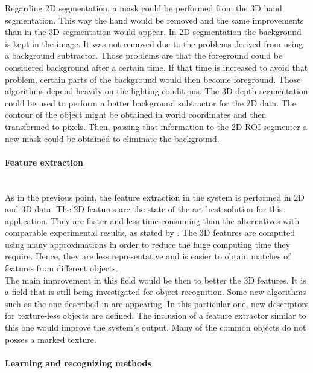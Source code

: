 	Regarding 2D segmentation, a mask could be performed from the 3D hand segmentation. 
	This way the hand would be removed and the same improvements than in the 3D segmentation would appear. 
	In 2D segmentation the background is kept in the image. 
	It was not removed due to the problems derived from using a background subtractor. 
	Those problems are that the foreground could be considered background after a certain time. 
	If that time is increased to avoid that problem, certain parts of the background would then become foreground. 
	Those algorithms depend heavily on the lighting conditions. 
	The 3D depth segmentation could be used to perform a better background subtractor for the 2D data. 
	The contour of the object might be obtained in world coordinates and then transformed to pixels. 
	Then, passing that information to the 2D ROI segmenter a new mask could be obtained to eliminate the background. 
	\\



	\paragraph{Feature extraction}\mbox{}\\

	As in the previous point, the feature extraction in the system is performed in 2D and 3D data. 
	The 2D features are the state-of-the-art best solution for this application. 
	They are faster and less time-consuming than the alternatives with comparable experimental results, as stated by \cite{Miksik2012}. 
	The 3D features are computed using many approximations in order to reduce the huge computing time they require. 
	Hence, they are less representative and is easier to obtain matches of features from different objects. 
	\\

	The main improvement in this field would be then to better the 3D features. 
	It is a field that is still being investigated for object recognition.
	Some new algorithms such as the one described in \cite{Hinterstoisser2012} are appearing. 
	In this particular one, new descriptors for texture-less objects are defined. 
	The inclusion of a feature extractor similar to this one would improve the system's output. 
	Many of the common objects do not posses a marked texture. 
	\\ 

	\paragraph{Learning and recognizing methods}\mbox{}\\

